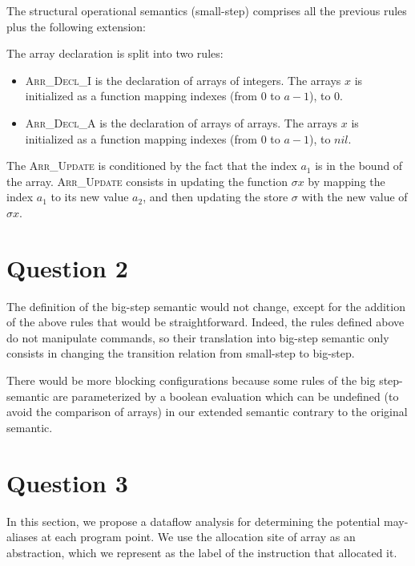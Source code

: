 \documentclass{article}
\begin{document}
The structural operational semantics (small-step) comprises all the previous rules plus the following extension:
The array declaration is split into two rules:
\begin{itemize}
 \item \textsc{Arr\_Decl\_I} is the declaration of arrays of integers. The arrays \(x\) is initialized as a function mapping indexes (from 0 to \(a-1\)), to 0.
 \item \textsc{Arr\_Decl\_A} is the declaration of arrays of arrays. The arrays \(x\) is initialized as a function mapping indexes (from 0 to \(a-1\)), to \(nil\).
\end{itemize}
The \textsc{Arr\_Update} is conditioned by the fact that the index \(a_1\) is in the bound of the array. \textsc{Arr\_Update} consists in updating the function \(\sigma x\) by mapping the index \(a_1\) to its new value \(a_2\), and then updating the store \(\sigma\) with the new value of \(\sigma x\).


\section*{Question 2}
The definition of the big-step semantic would not change, except for the addition of the above rules that would be straightforward.
Indeed, the rules defined above do not manipulate commands, so their translation into big-step semantic only consists in changing the transition relation from small-step to big-step.

There would be more blocking configurations because some rules of the big step-semantic are parameterized by a boolean evaluation which can be undefined (to avoid the comparison of arrays) in our extended semantic contrary to the original semantic.

\section*{Question 3}
In this section, we propose a dataflow analysis for determining the potential may-aliases at each program point. We use the allocation site of array as an abstraction, which we represent as the label of the instruction that allocated it.
\end{document}
